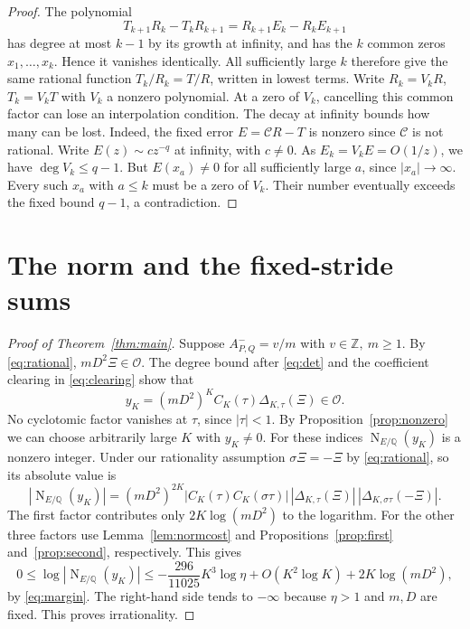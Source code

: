 \documentclass[11pt,letterpaper]{article}
\numberwithin{equation}{section}
\newcommand{\Q}{\mathbb Q}
\newcommand{\Z}{\mathbb Z}
\newcommand{\Ord}{\mathcal O}
\DeclareMathOperator{\Nm}{N}
\begin{document}
\begin{proof}
The polynomial
\[
          T_{k+1}R_k-T_kR_{k+1}=R_{k+1}E_k-R_kE_{k+1}
\]
has degree at most \(k-1\) by its growth at infinity, and has
the \(k\) common zeros \(x_1,\ldots,x_k\). Hence it vanishes
identically. All sufficiently large \(k\) therefore give the same
rational function \(T_k/R_k=T/R\), written in lowest terms.
Write \(R_k=V_kR\), \(T_k=V_kT\) with \(V_k\) a nonzero polynomial.
At a zero of \(V_k\), cancelling this common factor can lose an
interpolation condition. The decay at infinity bounds how many can
be lost. Indeed, the fixed error \(E=\mathcal C R-T\) is nonzero since
\(\mathcal C\) is not rational. Write \(E(z)\sim c z^{-q}\) at
infinity, with \(c\ne0\). As \(E_k=V_kE=O(1/z)\), we have
\(\deg V_k\le q-1\). But \(E(x_a)\ne0\) for all sufficiently large
\(a\), since \(|x_a|\to\infty\). Every such \(x_a\) with \(a\le k\)
must be a zero of \(V_k\). Their number eventually exceeds the fixed
bound \(q-1\), a contradiction.
\end{proof}

\newpage
\section{The norm and the fixed-stride sums}

\begin{proof}[Proof of Theorem~\ref{thm:main}]
Suppose \(A^-_{P,Q}=v/m\) with \(v\in\Z,\ m\ge1\).
By \eqref{eq:rational}, \(mD^2\Xi\in\Ord\). The degree bound after
\eqref{eq:det} and the coefficient clearing in \eqref{eq:clearing}
show that
\[
                y_K=(mD^2)^K C_K(\tau)\Delta_{K,\tau}(\Xi)\in\Ord .
\]
No cyclotomic factor vanishes at \(\tau\), since \(|\tau|<1\).
By Proposition~\ref{prop:nonzero} we can choose arbitrarily large
\(K\) with \(y_K\ne0\). For these indices \(\Nm_{E/\Q}(y_K)\)
is a nonzero integer. Under our rationality assumption
\(\sigma\Xi=-\Xi\) by \eqref{eq:rational}, so its absolute value is
\[
 |\Nm_{E/\Q}(y_K)|=(mD^2)^{2K}
 |C_K(\tau)C_K(\sigma\tau)|\,
 |\Delta_{K,\tau}(\Xi)|\,|\Delta_{K,\sigma\tau}(-\Xi)|.
\]
The first factor contributes only \(2K\log(mD^2)\) to the logarithm.
For the other three factors use Lemma~\ref{lem:normcost} and
Propositions~\ref{prop:first} and~\ref{prop:second}, respectively. This gives
\[
 0\le \log|\Nm_{E/\Q}(y_K)|
 \le -\frac{296}{11025}K^3\log\eta
                  +O(K^2\log K)+2K\log(mD^2),
\]
by \eqref{eq:margin}. The right-hand side tends to \(-\infty\)
because \(\eta>1\) and \(m,D\) are fixed. This proves irrationality.
\end{proof}
\end{document}
